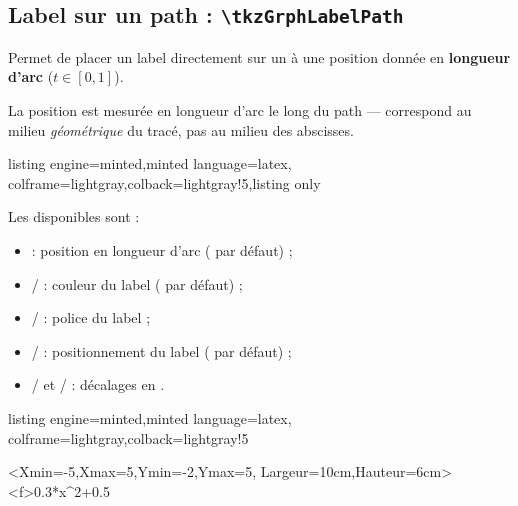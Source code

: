 \documentclass[11pt,a4paper]{ltxdoc}
\begin{document}
\subsection{Label sur un path : \texttt{\textbackslash tkzGrphLabelPath}}

Permet de placer un label directement sur un  à une position donnée en \textbf{longueur d'arc} ($t \in [0,1]$).

\smallskip

{\small\faBomb} La position  est mesurée en longueur d'arc le long du path —  correspond au milieu \textit{géométrique} du tracé, pas au milieu des abscisses.

\begin{tcblisting}{listing engine=minted,minted language=latex,
  colframe=lightgray,colback=lightgray!5,listing only}
\end{tcblisting}

Les \MontreCode{[clés]} disponibles sont :

\begin{itemize}
  \item {} : position en longueur d'arc ( par défaut) ;
  \item {} /  : couleur du label ( par défaut) ;
  \item {} /  : police du label ;
  \item {} /  : positionnement du label ( par défaut) ;
  \item {} /  et  /  : décalages en .
\end{itemize}

\begin{tcblisting}{listing engine=minted,minted language=latex,
  colframe=lightgray,colback=lightgray!5}
\begin{tkzGrph}<Xmin=-5,Xmax=5,Ymin=-2,Ymax=5,
               Largeur=10cm,Hauteur=6cm>
  \tkzGrphDefineCurve[trace,name=cf,color=red]<f>{0.3*x^2+0.5}
\end{tkzGrph}
\end{tcblisting}
\end{document}
